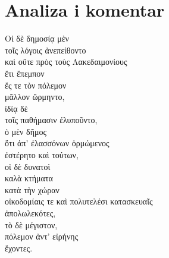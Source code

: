 \section*{Analiza i komentar}


{\large
\begin{greek}
\noindent Oἱ δὲ δημοσίᾳ μὲν \\
\tabto{2em} τοῖς λόγοις ἀνεπείθοντο \\
καὶ οὔτε πρὸς τοὺς Λακεδαιμονίους \\
\tabto{2em} ἔτι ἔπεμπον \\
ἔς τε τὸν πόλεμον \\
\tabto{2em} μᾶλλον ὥρμηντο, \\
ἰδίᾳ δὲ \\
\tabto{2em} τοῖς παθήμασιν ἐλυποῦντο, \\
\tabto{4em} ὁ μὲν δῆμος \\
\tabto{6em} ὅτι ἀπ' ἐλασσόνων ὁρμώμενος \\
\tabto{6em} ἐστέρητο καὶ τούτων, \\
\tabto{4em} οἱ δὲ δυνατοὶ \\
\tabto{6em} καλὰ κτήματα \\
\tabto{6em} κατὰ τὴν χώραν \\
\tabto{6em} οἰκοδομίαις τε καὶ πολυτελέσι κατασκευαῖς \\
\tabto{6em} ἀπολωλεκότες, \\
\tabto{2em} τὸ δὲ μέγιστον, \\
\tabto{4em} πόλεμον ἀντ' εἰρήνης \\
\tabto{6em} ἔχοντες.\\

\end{greek}
}

